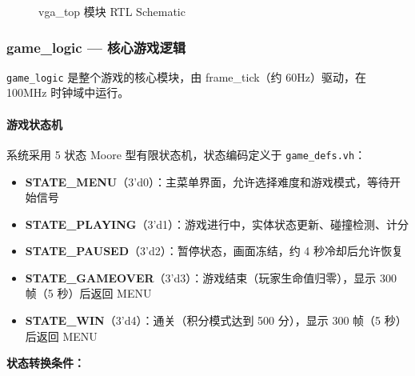 \documentclass[12pt,a4paper]{ctexart}
\begin{document}
\begin{figure}[H]
\centering
\caption{vga\_top 模块 RTL Schematic}
\label{fig:vgatop_rtl}
\end{figure}

\subsubsection{game\_logic --- 核心游戏逻辑}

\texttt{game\_logic} 是整个游戏的核心模块，由 frame\_tick（约 60Hz）驱动，在 100MHz 时钟域中运行。

\paragraph{游戏状态机}

系统采用 5 状态 Moore 型有限状态机，状态编码定义于 \texttt{game\_defs.vh}：

\begin{itemize}
    \item \textbf{STATE\_MENU}（3'd0）：主菜单界面，允许选择难度和游戏模式，等待开始信号
    \item \textbf{STATE\_PLAYING}（3'd1）：游戏进行中，实体状态更新、碰撞检测、计分
    \item \textbf{STATE\_PAUSED}（3'd2）：暂停状态，画面冻结，约 4 秒冷却后允许恢复
    \item \textbf{STATE\_GAMEOVER}（3'd3）：游戏结束（玩家生命值归零），显示 300 帧（5 秒）后返回 MENU
    \item \textbf{STATE\_WIN}（3'd4）：通关（积分模式达到 500 分），显示 300 帧（5 秒）后返回 MENU
\end{itemize}

\textbf{状态转换条件：}
\end{document}
